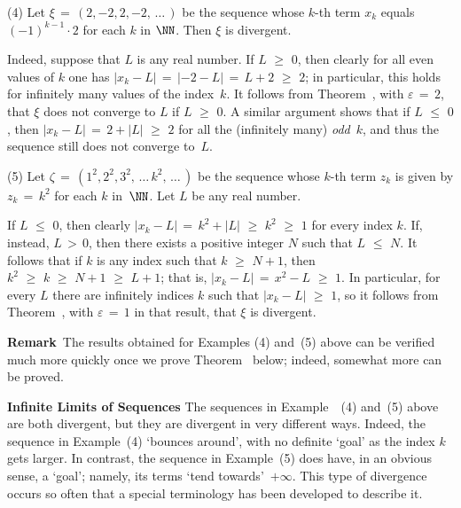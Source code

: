\V

        (4) Let ${\xi} \,=\, (2,-2,2,-2,\,{\ldots}\,)$ be the sequence whose $k$-th term $x_{k}$ equals $(-1)^{k-1}{\cdot}2$ for each $k$ in ${\NN}$. Then ${\xi}$ is divergent.

        Indeed, suppose that $L$ is any real number. If $L\,\,{\geq}\,\,0$, then clearly for all even values of $k$ one has $|x_{k}-L| \,=\, |-2-L| \,=\, L+2\,\,{\geq}\,\,2$;
    in particular, this holds for infinitely many values of the index~$k$. It follows from Theorem~,
    with ${\varepsilon} \,=\, 2$, that ${\xi}$ does not converge to $L$ if $L\,\,{\geq}\,\,0$. A similar argument shows that if $L\,\,{\leq}\,\,0$,
    then $|x_{k} - L| \,=\, 2+|L|\,\,{\geq}\,\,2$ for all the (infinitely many) {\em odd}~$k$, and thus the sequence still does not converge to~$L$.

\V

        (5) Let ${\zeta} \,=\, (1^{2}, 2^{2}, 3^{2},\,{\ldots}\,k^{2},\,{\ldots}\,)$ be the sequence whose $k$-th term $z_{k}$ is given by $z_{k} \,=\, k^{2}$ for each $k$ in~${\NN}$.
    Let $L$ be any real number.

        If $L\,\,{\leq}\,\,0$, then clearly $|x_{k} - L| \,=\, k^{2} + |L|\,\,{\geq}\,\,k^{2}\,\,{\geq}\,\,1$ for every index $k$.
    If, instead, $L\,>\,0$, then there exists a positive integer $N$ such that $L\,\,{\leq}\,\,N$. It follows that if $k$ is any index such that $k\,\,{\geq}\,\,N+1$,
    then $k^{2}\,\,{\geq}\,\,k\,\,{\geq}\,\,N+1\,\,{\geq}\,\,L+1$; that is, $|x_{k} - L| \,=\, x^{2}-L\,\,{\geq}\,\,1$.
    In particular, for every $L$ there are infinitely indices $k$ such that $|x_{k} - L|\,\,{\geq}\,\,1$, so it follows from Theorem~,
    with ${\varepsilon} \,=\, 1$ in that result, that ${\xi}$ is divergent.

\V

        {\bf Remark}\, The results obtained for Examples (4) and~(5) above can be verified much more quickly once we prove Theorem~ below; indeed, somewhat more can be proved.


\VV

        {\bf Infinite Limits of Sequences} The sequences in Example~~(4) and~(5) above are both divergent,
    but they are divergent in very different ways. Indeed, the sequence in Example~(4) `bounces around',
    with no definite `goal' as the index $k$ gets larger. In contrast, the sequence in Example~(5) does have,
    in an obvious sense, a `goal'; namely, its terms `tend towards'~$+{\infty}$. This type of divergence occurs so often that a special terminology has been 
    developed to describe it.

